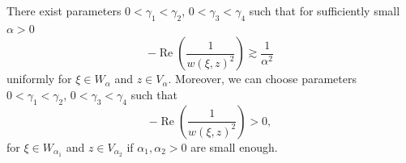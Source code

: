 \documentclass[10pt,a4paper]{amsart}
\newcommand{\RE}{ \mathop{\mathrm{Re}} }
\begin{document}
\begin{lem} \label{lm:EstOfKernel}
	There exist parameters $0<\gamma_1<\gamma_2$, $0<\gamma_3<\gamma_4$ such that for sufficiently small $\alpha>0$ 
	\begin{equation}\label{lm:EstOfKernel_eq1}
		-\RE\left(\frac{1}{w(\xi,z)^2}\right) \gtrsim \frac{1}{\alpha^2}
	\end{equation}
	uniformly for $\xi\in W_\alpha$ and $z\in V_\alpha$. Moreover, we can choose parameters $0<\gamma_1<\gamma_2$, $0<\gamma_3<\gamma_4$ such that
	\begin{equation}\label{lm:EstOfKernel_eq2}
		-\RE\left(\frac{1}{w(\xi,z)^2}\right) > 0 , 
	\end{equation}
	for $\xi\in W_{\alpha_1}$ and $z\in V_{\alpha_2}$ if $\alpha_1, \alpha_2>0$ are small enough.
\end{lem}
\end{document}
